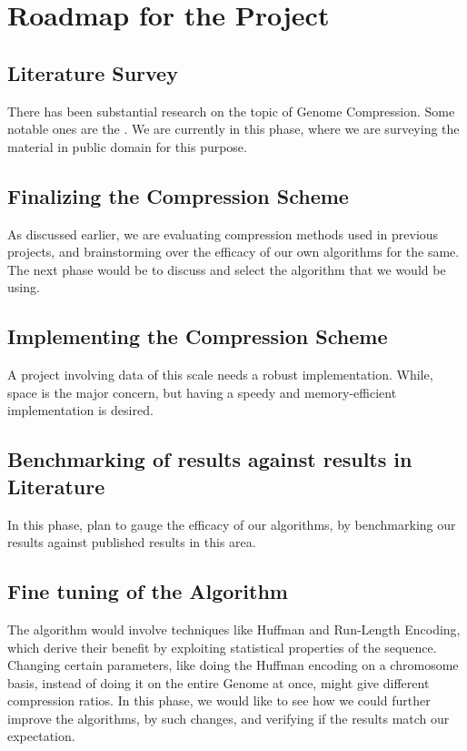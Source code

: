 \documentclass{article}
\begin{document}
\section{Roadmap for the Project}

\subsection{Literature Survey}
There has been substantial research on the topic of Genome Compression. Some notable ones are the \cite{jorde04,dnazip,dnazip_paper, gencompress}. We are currently in this phase, where we are surveying the material in public domain for this purpose. 

\subsection{Finalizing the Compression Scheme}
As discussed earlier, we are evaluating compression methods used in previous projects, and brainstorming over the efficacy of our own algorithms for the same. The next phase would be to discuss and select the algorithm that we would be using.

\subsection{Implementing the Compression Scheme}
A project involving data of this scale needs a robust implementation. While, space is the major concern, but having a speedy and memory-efficient implementation is desired. 

\subsection{Benchmarking of results against results in Literature}
In this phase, plan to gauge the efficacy of our algorithms, by benchmarking our results against published results in this area.

\subsection{Fine tuning of the Algorithm}
The algorithm would involve techniques like Huffman and Run-Length Encoding, which derive their benefit by exploiting statistical properties of the sequence. Changing certain parameters, like doing the Huffman encoding on a chromosome basis, instead of doing it on the entire Genome at once, might give different compression ratios. In this phase, we would like to see how we could further improve the algorithms, by such changes, and verifying if the results match our expectation.
\end{document}
